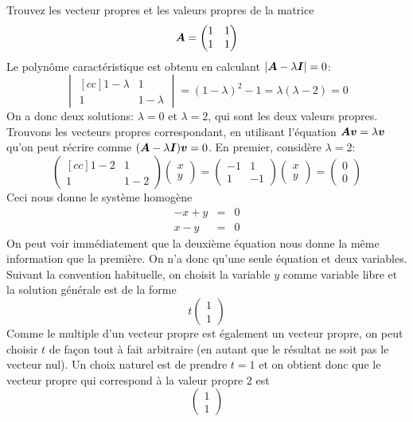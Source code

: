 \begin{exemple}\label{ex:propre}
Trouvez les vecteur propres et les valeurs propres de la matrice
\[
\boldsymbol{A} = \begin{pmatrix}
1 & 1 \\ 1 & 1
\end{pmatrix}
\]
\solution
Le polynôme caractéristique est obtenu en calculant $|\boldsymbol{A} - \lambda\boldsymbol{I}|=0$:
\[
\begin{vmatrix}[cc]
1-\lambda & 1 \\ 1 & 1-\lambda
\end{vmatrix} = (1-\lambda)^2 - 1 = \lambda(\lambda-2) = 0
\]
On a donc deux solutions: $\lambda = 0$ et $\lambda = 2$, qui sont les deux valeurs propres.
Trouvons les vecteurs propres correspondant, en utilisant l'équation 
$\boldsymbol{A} \boldsymbol{v} = \lambda \boldsymbol{v}$ qu'on peut récrire comme 
$(\boldsymbol{A} - \lambda\boldsymbol{I})\boldsymbol{v} = 0$.  En premier, considère $\lambda= 2$:
\[
\begin{pmatrix}[cc]
1-2 & 1 \\ 1 & 1-2
\end{pmatrix} \begin{pmatrix}
x \\ y
\end{pmatrix} = \begin{pmatrix}
-1 & 1 \\ 1 & -1
\end{pmatrix} \begin{pmatrix}
x \\ y
\end{pmatrix} 
= \begin{pmatrix}
0 \\ 0
\end{pmatrix}
\]
Ceci nous donne le système homogène
\begin{eqnarray*}
-x + y &=& 0 \\
x - y &=& 0
\end{eqnarray*}
On peut voir immédiatement que la deuxième équation nous donne la même information que la première.
On n'a donc qu'une seule équation et deux variables.  Suivant la convention habituelle,
on choisit la variable $y$ comme variable libre et la solution générale est de la forme
\[
t\begin{pmatrix}
1 \\ 1
\end{pmatrix}
\]
Comme le multiple d'un vecteur propre est également un vecteur propre, on peut choisir $t$ de
façon tout à fait arbitraire (en autant que le résultat ne soit pas le vecteur nul).
Un choix naturel est de prendre $t=1$ et on obtient donc que le vecteur propre qui correspond
à la valeur propre $2$ est
\[
\begin{pmatrix}
1 \\ 1
\end{pmatrix}
\]
\end{exemple}
